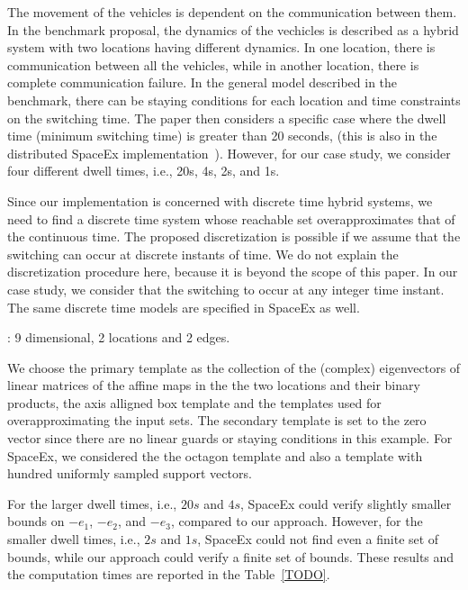 The movement of the vehicles is dependent on the communication between
them.  In the benchmark proposal, the dynamics of the vechicles is
described as a hybrid system with two locations having different
dynamics.  In one location, there is communication between all the
vehicles, while in another location, there is complete communication
failure.  In the general model described in the benchmark, there can
be staying conditions for each location and time constraints on the
switching time.  The paper then considers a specific case where the
dwell time (minimum switching time) is greater than 20 seconds, (this
is also in the distributed SpaceEx implementation~\cite{TODO}).
However, for our case study, we consider four different dwell times,
i.e., 20s, 4s, 2s, and 1s.


  Since our implementation is concerned with discrete
time hybrid systems, we need to find a discrete time system whose
reachable set overapproximates that of the continuous time.  The
proposed discretization is possible if we assume that the switching
can occur at discrete instants of time.  We do not explain the
discretization procedure here, because it is beyond the scope of this
paper.  In our case study, we consider that the switching to occur at
any integer time instant.  The same discrete time models are
specified in SpaceEx as well. 

: 9 dimensional, 2 locations and 2 edges. 

  We choose the primary template as the
collection of the (complex) eigenvectors of linear matrices of the
affine maps in the the two locations and their binary products, the
axis alligned box template and the templates used for
overapproximating the input sets.  The secondary template is set to
the zero vector since there are no linear guards or staying conditions
in this example.  For SpaceEx, we considered the
the octagon template and also a template with hundred uniformly
sampled support vectors.

  For the larger dwell times, i.e., $20s$ and $4s$,
SpaceEx could verify slightly smaller bounds on $-e_1$, $-e_2$, and
$-e_3$, compared to our approach.  However, for the smaller dwell
times, i.e., $2s$ and $1s$, SpaceEx could not find even a finite set of
bounds, while our approach could verify a finite set of bounds.  These
results and the computation times are reported in the
Table~\ref{TODO}.


